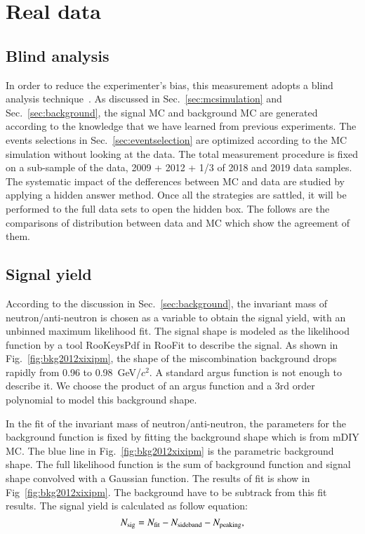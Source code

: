 \section{Real data}
\subsection{Blind analysis}
In order to reduce the experimenter's bias, this measurement
adopts a blind analysis technique~\cite{Roodman:2003rw}. As discussed in 
Sec.~\ref{sec:mcsimulation} and Sec.~\ref{sec:background},
the signal MC and background MC are generated according to the
knowledge that we have learned from previous experiments. The events
selections in Sec.~\ref{sec:eventselection} are optimized according 
to the MC simulation without looking at the data. The total measurement
procedure is fixed on a sub-sample of the data, 2009 + 2012 + 1/3 of 2018 
and 2019 data samples.
The systematic impact of the defferences between MC and data are
studied by applying a hidden answer method. Once all the strategies
are sattled, it will be performed to the full data sets to open the
hidden box. The follows are the comparisons of distribution  
between data and MC which show the agreement of them.

\subsection{Signal yield}
According to the discussion in Sec.~\ref{sec:background}, the invariant mass
of neutron/anti-neutron is chosen as a variable to obtain the signal yield,
with an unbinned maximum likelihood fit. The signal shape is modeled as the
likelihood function by a tool {\sc RooKeysPdf} in {\sc RooFit} to describe  
the signal. As shown in Fig.~\ref{fig:bkg2012xixipm}, the 
shape of the miscombination background drops rapidly from 0.96 to 0.98~GeV/$c^2$.
A standard argus function is not enough to describe it. We choose the product
of an argus function and a 3rd order polynomial to model this background shape.

In the fit of the invariant mass of neutron/anti-neutron, the parameters for 
the background function is fixed by fitting the background shape which is 
from mDIY MC. The blue line in Fig.~\ref{fig:bkg2012xixipm} is the 
parametric background shape. The full likelihood function is the sum of 
background function and signal shape convolved with a Gaussian 
function. The results of fit is show in Fig~\ref{fig:bkg2012xixipm}. 
The background have to 
be subtrack from this fit results. The signal yield is calculated as follow 
equation:
\begin{equation}
	N_{\rm sig} = N_{\rm fit} - N_{\rm sideband} - N_{\rm peaking},
\end{equation}

